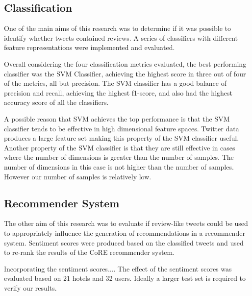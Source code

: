 \subsection{Classification}

One of the main aims of this research was to determine if it was possible to identify whether tweets contained reviews. A series of classifiers with different feature representations were implemented and evaluated. 

Overall considering the four classification metrics evaluated, the best performing classifier was the SVM Classifier, achieving the highest score in three out of four of the metrics, all but precision. The SVM classifier has a good balance of precision and recall, achieving the highest f1-score, and also had the highest accuracy score of all the classifiers.

A possible reason that SVM achieves the top performance is that the SVM classifier tends to be effective in high dimensional feature spaces. Twitter data produces a large feature set making this property of the SVM classifier useful. Another property of the SVM classifier is that they are still effective in cases where the number of dimensions is greater than the number of samples. The number of dimensions in this case is not higher than the number of samples. However our number of samples is relatively low.

\subsection{Recommender System}

The other aim of this research was to evaluate if review-like tweets could be used to appropriately influence the generation of recommendations in a recommender system. Sentiment scores were produced based on the classified tweets and used to re-rank the results of the CoRE recommender system. 

Incorporating the sentiment scores.... The effect of the sentiment scores was evaluated based on 21 hotels and 32 users. Ideally a larger test set is required to verify our results.

